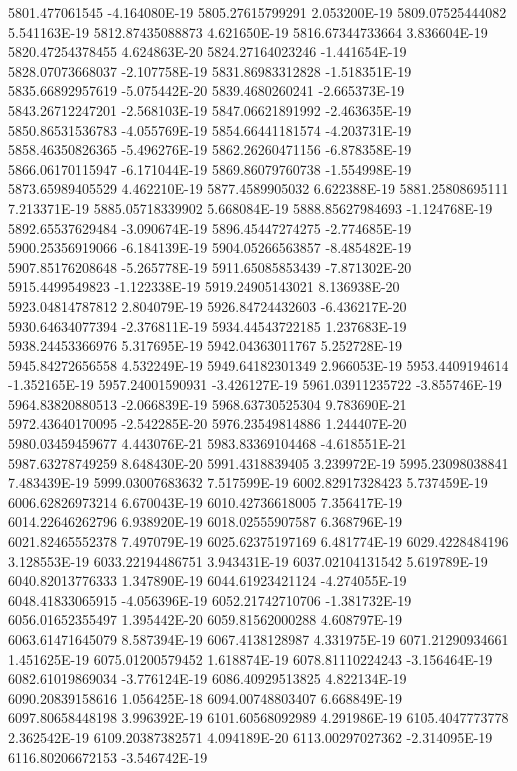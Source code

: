 5801.477061545  -4.164080E-19
5805.27615799291  2.053200E-19
5809.07525444082  5.541163E-19
5812.87435088873  4.621650E-19
5816.67344733664  3.836604E-19
5820.47254378455  4.624863E-20
5824.27164023246  -1.441654E-19
5828.07073668037  -2.107758E-19
5831.86983312828  -1.518351E-19
5835.66892957619  -5.075442E-20
5839.4680260241  -2.665373E-19
5843.26712247201  -2.568103E-19
5847.06621891992  -2.463635E-19
5850.86531536783  -4.055769E-19
5854.66441181574  -4.203731E-19
5858.46350826365  -5.496276E-19
5862.26260471156  -6.878358E-19
5866.06170115947  -6.171044E-19
5869.86079760738  -1.554998E-19
5873.65989405529  4.462210E-19
5877.4589905032  6.622388E-19
5881.25808695111  7.213371E-19
5885.05718339902  5.668084E-19
5888.85627984693  -1.124768E-19
5892.65537629484  -3.090674E-19
5896.45447274275  -2.774685E-19
5900.25356919066  -6.184139E-19
5904.05266563857  -8.485482E-19
5907.85176208648  -5.265778E-19
5911.65085853439  -7.871302E-20
5915.4499549823  -1.122338E-19
5919.24905143021  8.136938E-20
5923.04814787812  2.804079E-19
5926.84724432603  -6.436217E-20
5930.64634077394  -2.376811E-19
5934.44543722185  1.237683E-19
5938.24453366976  5.317695E-19
5942.04363011767  5.252728E-19
5945.84272656558  4.532249E-19
5949.64182301349  2.966053E-19
5953.4409194614  -1.352165E-19
5957.24001590931  -3.426127E-19
5961.03911235722  -3.855746E-19
5964.83820880513  -2.066839E-19
5968.63730525304  9.783690E-21
5972.43640170095  -2.542285E-20
5976.23549814886  1.244407E-20
5980.03459459677  4.443076E-21
5983.83369104468  -4.618551E-21
5987.63278749259  8.648430E-20
5991.4318839405  3.239972E-19
5995.23098038841  7.483439E-19
5999.03007683632  7.517599E-19
6002.82917328423  5.737459E-19
6006.62826973214  6.670043E-19
6010.42736618005  7.356417E-19
6014.22646262796  6.938920E-19
6018.02555907587  6.368796E-19
6021.82465552378  7.497079E-19
6025.62375197169  6.481774E-19
6029.4228484196  3.128553E-19
6033.22194486751  3.943431E-19
6037.02104131542  5.619789E-19
6040.82013776333  1.347890E-19
6044.61923421124  -4.274055E-19
6048.41833065915  -4.056396E-19
6052.21742710706  -1.381732E-19
6056.01652355497  1.395442E-20
6059.81562000288  4.608797E-19
6063.61471645079  8.587394E-19
6067.4138128987  4.331975E-19
6071.21290934661  1.451625E-19
6075.01200579452  1.618874E-19
6078.81110224243  -3.156464E-19
6082.61019869034  -3.776124E-19
6086.40929513825  4.822134E-19
6090.20839158616  1.056425E-18
6094.00748803407  6.668849E-19
6097.80658448198  3.996392E-19
6101.60568092989  4.291986E-19
6105.4047773778  2.362542E-19
6109.20387382571  4.094189E-20
6113.00297027362  -2.314095E-19
6116.80206672153  -3.546742E-19
